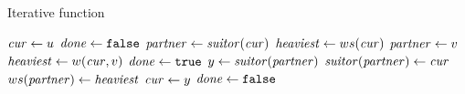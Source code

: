 \begin{algorithm}[t]
\caption{\footnotesize Iterative \findsuitor function}
\label{algo:iter-find-suitor}
\begin{algorithmic}[1]
\footnotesize
{}
\State$\mathit{cur} \gets u$
\State$\mathit{done} \gets \texttt{false}$
\Repeat
\State$\mathit{partner} \gets \mathit{suitor}(\mathit{cur})$
\State$\mathit{heaviest} \gets ws(\mathit{cur})$
\label{line:iter-find-suitor:for-neigh}
\State$\mathit{partner} \gets v$
\State$\mathit{heaviest} \gets w(\mathit{cur}, v)$
\EndIf
\EndFor\label{line:iter-find-suitor:for-neigh-end}
\State$\mathit{done} \gets \texttt{true}$
\label{line:iter-find-suitor:if-heaviest}
\State$y \gets \mathit{suitor}(\mathit{partner})$\label{line:iter-find-suitor:update-1}
\State$\mathit{suitor}(\mathit{partner}) \gets \mathit{cur}$
\State$ws(\mathit{partner}) \gets \mathit{heaviest}$\label{line:iter-find-suitor:update-2}
\label{line:iter-find-suitor:if-y}
\State$\mathit{cur} \gets y$
\State$\mathit{done} \gets \texttt{false}$\label{line:iter-find-suitor:if-y-end}
\EndIf
\EndIf
{}
\EndFunction
\end{algorithmic}
\end{algorithm}
